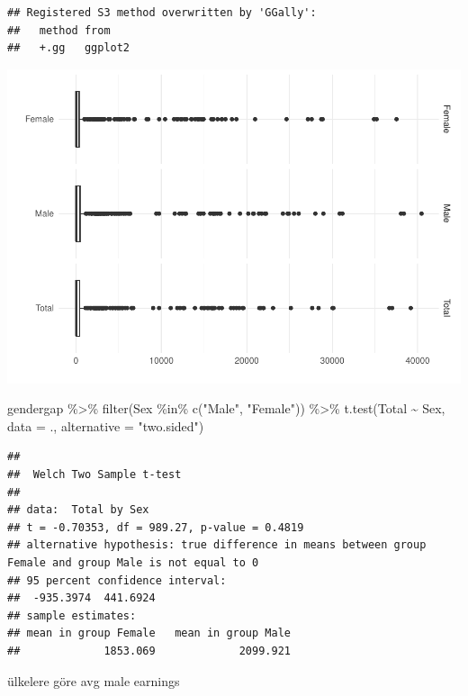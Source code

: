 \documentclass[
]{article}
\newenvironment{Shaded}{\begin{snugshade}}{\end{snugshade}}
\newcommand{\AttributeTok}[1]{\textcolor[rgb]{0.77,0.63,0.00}{#1}}
\newcommand{\FunctionTok}[1]{\textcolor[rgb]{0.00,0.00,0.00}{#1}}
\newcommand{\NormalTok}[1]{#1}
\newcommand{\SpecialCharTok}[1]{\textcolor[rgb]{0.00,0.00,0.00}{#1}}
\newcommand{\StringTok}[1]{\textcolor[rgb]{0.31,0.60,0.02}{#1}}
\begin{document}
\begin{verbatim}
## Registered S3 method overwritten by 'GGally':
##   method from   
##   +.gg   ggplot2
\end{verbatim}

\includegraphics{Data-Analysis_files/figure-latex/unnamed-chunk-3-1.pdf}

\begin{Shaded}
\begin{Highlighting}[]
\NormalTok{gendergap }\SpecialCharTok{\%\textgreater{}\%}
\FunctionTok{filter}\NormalTok{(Sex }\SpecialCharTok{\%in\%} \FunctionTok{c}\NormalTok{(}\StringTok{"Male"}\NormalTok{, }\StringTok{"Female"}\NormalTok{)) }\SpecialCharTok{\%\textgreater{}\%}
\FunctionTok{t.test}\NormalTok{(Total }\SpecialCharTok{\textasciitilde{}}\NormalTok{ Sex, }\AttributeTok{data =}\NormalTok{ ., }\AttributeTok{alternative =} \StringTok{"two.sided"}\NormalTok{)}
\end{Highlighting}
\end{Shaded}

\begin{verbatim}
## 
##  Welch Two Sample t-test
## 
## data:  Total by Sex
## t = -0.70353, df = 989.27, p-value = 0.4819
## alternative hypothesis: true difference in means between group Female and group Male is not equal to 0
## 95 percent confidence interval:
##  -935.3974  441.6924
## sample estimates:
## mean in group Female   mean in group Male 
##             1853.069             2099.921
\end{verbatim}

ülkelere göre avg male earnings
\end{document}
